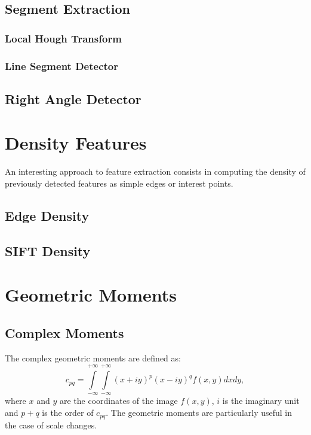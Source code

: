 \subsection{Segment Extraction}
\label{sec:SegmentExtraction}
\subsubsection{Local Hough Transform}

%
%

\subsubsection{Line Segment Detector}
\label{sec:LSD}

\subsection{Right Angle Detector}
\label{sec:RightAngleDetector}



\section{Density Features}
An interesting approach to feature extraction consists in computing
the density of previously detected features as simple edges or
interest points.
\subsection{Edge Density}

\subsection{SIFT Density}

% 

\section{Geometric Moments}

\subsection{Complex Moments}
\label{sec:ComplexMoments}
The complex geometric moments are defined as:
\begin {equation}
c_{pq} = \int\limits_{-\infty}^{+\infty}\int\limits_{-\infty}^{+\infty}(x + iy)^p(x- iy)^qf(x,y)dxdy,
\label{2.2}
\end{equation}
where $x$ and $y$ are the coordinates of the image $f(x,y)$, $i$ is the
imaginary unit and
$p+q$ is the order of $c_{pq}$. The geometric moments are
particularly useful in the case of scale changes.

